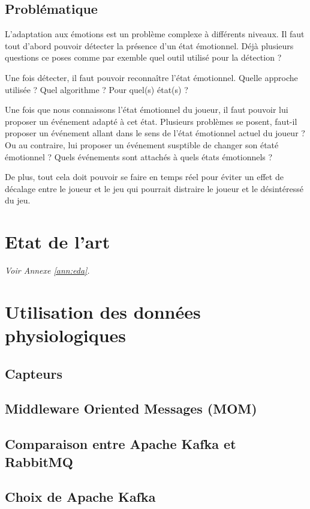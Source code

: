 \documentclass{article}
\begin{document}
	\subsection{Problématique}
		L'adaptation aux émotions est un problème complexe à différents niveaux.
		Il faut tout d'abord pouvoir détecter la présence d'un état émotionnel.
		Déjà plusieurs questions ce poses comme par exemble quel outil utilisé pour la détection ?\par
		Une fois détecter, il faut pouvoir reconnaître l'état émotionnel. Quelle approche utilisée ? Quel algorithme ? Pour quel(s) état(s) ?\par
		Une fois que nous connaissons l'état émotionnel du joueur, il faut pouvoir lui proposer un événement adapté à cet état. Plusieurs problèmes se posent, faut-il proposer un événement allant dans le sens de l'état émotionnel actuel du joueur ? Ou au contraire, lui proposer un événement susptible de changer son étaté émotionnel ? Quels événements sont attachés à quels états émotionnels ?\par
		De plus, tout cela doit pouvoir se faire en temps réel pour éviter un effet de décalage entre le joueur et le jeu qui pourrait distraire le joueur et le désintéressé du jeu.\par

\section{Etat de l'art}
	\textit{Voir Annexe \ref{ann:eda}.}

\section{Utilisation des données physiologiques}
	\subsection{Capteurs}
	\subsection{Middleware Oriented Messages (MOM)}
		\subsection{Comparaison entre Apache Kafka et RabbitMQ}
		\subsection{Choix de Apache Kafka}
\end{document}
